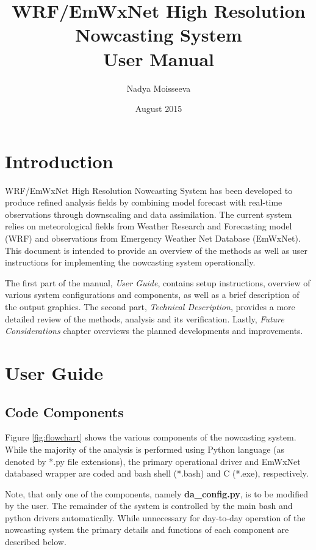 \documentclass{article}
\begin{document}
\title{WRF/EmWxNet High Resolution Nowcasting System \\ User Manual}
\author{Nadya Moisseeva}
\date{August 2015}    %

\maketitle
\tableofcontents

\newpage
\section*{Introduction}

WRF/EmWxNet High Resolution Nowcasting System has been developed to produce refined analysis fields by combining model forecast with real-time observations through downscaling and data assimilation. The current system relies on meteorological fields from Weather Research and Forecasting model (WRF) and observations from Emergency Weather Net Database (EmWxNet). This document is intended to provide an overview of the methods as well as user instructions for implementing the nowcasting system operationally. 

The first part of the manual, \emph{User Guide}, contains setup instructions, overview of various system configurations and components, as well as a brief description of the output graphics. The second part, \emph{Technical Description}, provides a more detailed review of the methods, analysis and its verification. Lastly, \emph{Future Considerations} chapter overviews the planned developments and improvements. 

\newpage
\section{User Guide}
\subsection{Code Components}

\FloatBarrier
Figure \ref{fig:flowchart} shows the various components of the nowcasting system. While the majority of the analysis is performed using Python language (as denoted by *.py file extensions), the primary operational driver and EmWxNet databased wrapper are coded and bash shell (*.bash) and C (*.exe), respectively. 

Note, that only one of the components, namely \textbf{da\_config.py}, is to be modified by the user. The remainder of the system is controlled by the main bash and python drivers automatically. While unnecessary for day-to-day operation of the nowcasting system the primary details and functions of each component are described below. 
\end{document}
